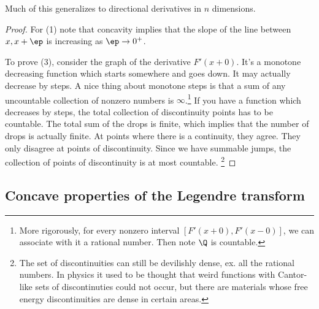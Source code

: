 
Much of this generalizes to directional derivatives in $n$ dimensions.
\begin{proof}
For (1) note that concavity implies that the slope of the line between $x,x+\ep$ is increasing as $\ep\to 0^+$.


To prove (3), consider the graph of the derivative $F'(x + 0)$. It's a monotone decreasing function which starts somewhere and goes down. It may actually decrease by steps. A nice thing about monotone steps is that a sum of any uncountable collection of nonzero numbers is $\infty$.\footnote{More rigorously, for every nonzero interval $[F'(x+0),F'(x-0)]$, we can associate with it a rational number. Then note $\Q$ is countable. } If you have a function which decreases by steps, the total collection of discontinuity points has to be countable. The total sum of the drops is finite, which implies that the number of drops is actually finite. At points where there is a continuity, they agree. They only disagree at points of discontinuity. Since we have summable jumps, the collection of points of discontinuity is at most countable.
\footnote{The set of discontinuities can still be devilishly dense, ex. all the rational numbers. In physics it used to be thought that weird functions with Cantor-like sets of discontinuties could not occur, but there are materials whose free energy discontinuities are dense in certain areas.}

\end{proof}

\subsection{Concave properties of the Legendre transform}

